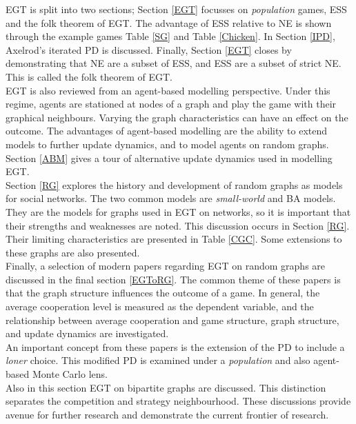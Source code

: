 EGT is split into two sections; Section \ref{EGT} focusses on \emph{population} games, ESS and the folk theorem of EGT. The advantage of ESS relative to NE is shown through the example games Table \ref{SG} and Table \ref{Chicken}. In Section \ref{IPD}, Axelrod's iterated PD is discussed. Finally, Section \ref{EGT} closes by demonstrating  that NE are a subset of ESS, and ESS are a subset of strict NE. This is called the folk theorem of EGT. \\

EGT is also reviewed from an agent-based modelling perspective. Under this regime, agents are stationed at nodes of a graph and play the game with their graphical neighbours. Varying the graph characteristics can have an effect on the outcome. The advantages of agent-based modelling are the ability to extend models to further update dynamics, and to model agents on random graphs. Section \ref{ABM} gives a tour of alternative update dynamics used in modelling EGT. \\


Section \ref{RG} explores the history and development of random graphs as models for social networks. The two common models are \emph{small-world} and BA models. They are the models for graphs used in EGT on networks, so it is important that their strengths and weaknesses are noted. This discussion occurs in Section \ref{RG}. Their limiting characteristics are presented in Table \ref{CGC}. Some extensions to these graphs are also presented. \\

Finally, a selection of modern papers regarding EGT on random graphs are discussed in the final section \ref{EGToRG}. The common theme of these papers is that the graph structure influences the outcome of a game. In general, the average cooperation level is measured as the dependent variable, and the relationship between average cooperation and game structure, graph structure, and update dynamics are investigated. \\

An important concept from these papers is the extension of the PD to include a \emph{loner} choice. This modified PD is examined under a \emph{population} and also agent-based Monte Carlo lens. \\

Also in this section EGT on bipartite graphs are discussed. This distinction separates the competition and strategy neighbourhood. These discussions provide avenue for further research and demonstrate the current frontier of research. \\




